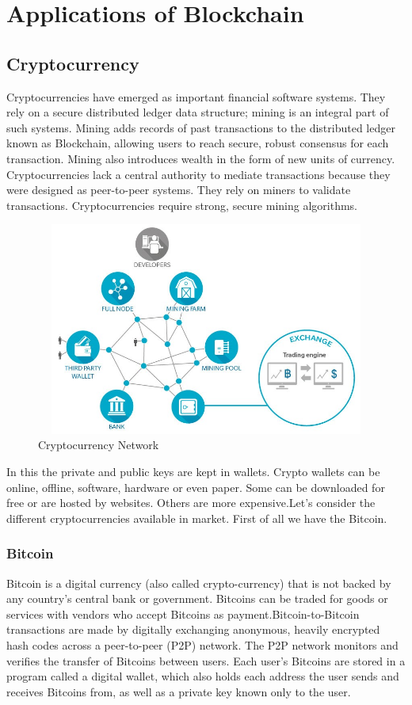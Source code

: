 \documentclass[12pt]{report}
\begin{document}
\chapter{Applications of Blockchain}
\section{Cryptocurrency}
\par Cryptocurrencies have emerged as important financial software systems. They rely on a secure distributed ledger data structure; mining is an integral part of such systems. Mining adds records of past transactions to the distributed ledger known as Blockchain, allowing users to reach secure, robust consensus for each transaction. Mining also introduces wealth in the form of new units of currency. Cryptocurrencies lack a central authority to mediate transactions because they were designed as peer-to-peer systems. They rely on miners to validate transactions. Cryptocurrencies require strong, secure mining algorithms.
\begin{figure}
    \centering
    \includegraphics[width=14cm,height=7cm]{cryptocurrency.jpg}
    \caption{Cryptocurrency Network}
    \label{fig:my_label}
\end{figure}
\par In this the private and public keys are kept in wallets. Crypto wallets can be online, offline, software, hardware or even paper. Some can be downloaded for free or are hosted by websites. Others are more expensive.Let's consider the different cryptocurrencies available in market. First of all we have the Bitcoin.
\subsection{Bitcoin}
\par Bitcoin is a digital currency (also called crypto-currency) that is not backed by any country's central bank or government. Bitcoins can be traded for goods or services with vendors who accept Bitcoins as payment.Bitcoin-to-Bitcoin transactions are made by digitally exchanging anonymous, heavily encrypted hash codes across a peer-to-peer (P2P) network. The P2P network monitors and verifies the transfer of Bitcoins between users. Each user's Bitcoins are stored in a program called a digital wallet, which also holds each address the user sends and receives Bitcoins from, as well as a private key known only to the user. 
\end{document}
